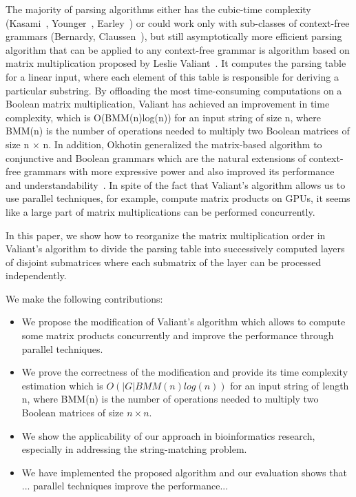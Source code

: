 The majority of parsing algorithms either has the cubic-time complexity (Kasami~\cite{Kas}, Younger~\cite{Younger:1966:CLP:1441427.1442019}, Earley~\cite{Earley:1970:ECP:362007.362035}) or could work only with sub-classes of context-free grammars (Bernardy, Claussen~\cite{Bernardy:2013:EDP:2544174.2500576}), but still asymptotically more efficient parsing algorithm that can be applied to any context-free grammar is algorithm based on matrix multiplication proposed by Leslie Valiant~\cite{Valiant:1975:GCR:1739932.1740048}. It computes the parsing table for a linear input, where each element of this table is responsible for deriving a particular substring. By offloading the most time-consuming computations on a Boolean matrix multiplication, Valiant has achieved an improvement in time complexity, which is O(BMM(n)log(n)) for an input string of size n, where BMM(n) is the number of operations needed to multiply two Boolean matrices of size n $\times$ n. In addition, Okhotin generalized the matrix-based algorithm to conjunctive and Boolean grammars which are the natural extensions of context-free grammars with more expressive power and also improved its performance and understandability~\cite{Okhotin:2014:PMM:2565359.2565379}. In spite of the fact that Valiant's algorithm allows us to use parallel techniques, for example, compute matrix products on GPUs, it seems like a large part of matrix multiplications can be performed concurrently.

In this paper, we show how to reorganize the matrix multiplication order in Valiant's algorithm to divide the parsing table into successively computed layers of disjoint submatrices where each submatrix of the layer can be processed independently.

We make the following contributions:
\begin{itemize}
  \item We propose the modification of Valiant's algorithm which allows to compute some matrix products concurrently and improve the performance through parallel techniques.
  \item We prove the correctness of the modification and provide its time complexity estimation which is $O(|G|BMM(n)log(n))$ for an input string of length n, where BMM(n) is the number of operations needed to multiply two Boolean matrices of size $n \times n$.
  \item We show the applicability of our approach in bioinformatics research, especially in addressing the string-matching problem.
  \item We have implemented the proposed algorithm and our evaluation shows that ... parallel techniques improve the performance...
\end{itemize}
